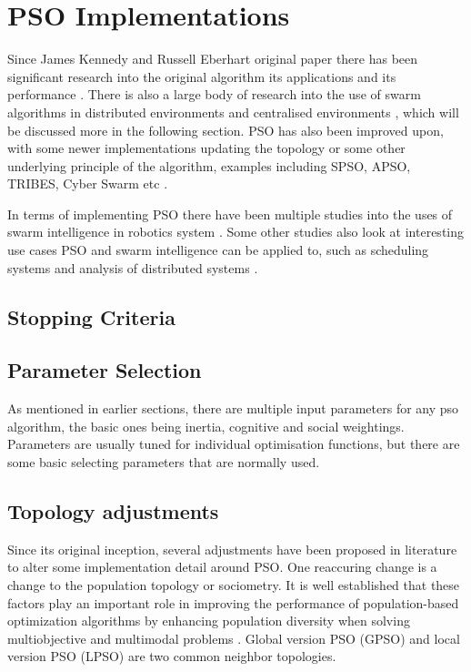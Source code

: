\documentclass[oneside,12pt]{book}
\begin{document}
\section{PSO Implementations}
Since James Kennedy and Russell Eberhart original paper there has been significant research into the original algorithm \cite{piotrowski_napiorkowski_piotrowska_2020, bai_2010, imrantextordfeminine2013overview, wang_tan_liu_2017} its applications \cite{hereford_2006, beni_2005, blum_li, raquel2005effective} and its performance \cite{yin_yu_wang_wang_2006, kennedy_1999}. There is also a large body of research into the use of swarm algorithms in distributed environments \cite{akat_gazi_2008, salza_ferrucci_2019, peleg_2005} and centralised environments \cite{trelea_2003, xie2003overview, poli2007particle}, which will be discussed more in the following section. PSO has also been improved upon, with some newer implementations updating the topology or some other underlying principle of the algorithm, examples including SPSO, APSO, TRIBES, Cyber Swarm etc \cite{zhou2009gpu, oca_stutzle_birattari_dorigo_2009, cooren2009performance, yin2010cyber}.

In terms of implementing PSO there have been multiple studies into the uses of swarm intelligence in robotics system \cite{sa_nedjah_mourelle_2016, meng_gan_2008, hereford_2006}. Some other studies also look at interesting use cases PSO and swarm intelligence can be applied to, such as scheduling systems and analysis of distributed systems \cite{li_yang_su_lu_yu_2019, moradi_fotuhi-firuzabad_2008, nouiri_bekrar_jemai_niar_ammari_2015, sahin2007fault}. 

\subsection{Stopping Criteria}

\subsection{Parameter Selection}
As mentioned in earlier sections, there are multiple input parameters for any pso algorithm, the basic ones being inertia, cognitive and social weightings. Parameters are usually tuned for individual optimisation functions, but there are some basic selecting parameters that are normally used. 

\subsection{Topology adjustments}
Since its original inception, several adjustments have been proposed in literature to alter some implementation detail around PSO. One reaccuring change is a change to the population topology or sociometry. It is well established that these factors play an important role in improving the performance of population-based optimization algorithms by enhancing population diversity when solving multiobjective and multimodal problems \cite{LYNN201824}. Global version PSO (GPSO) and local version PSO (LPSO) are two common neighbor topologies. 
\end{document}
